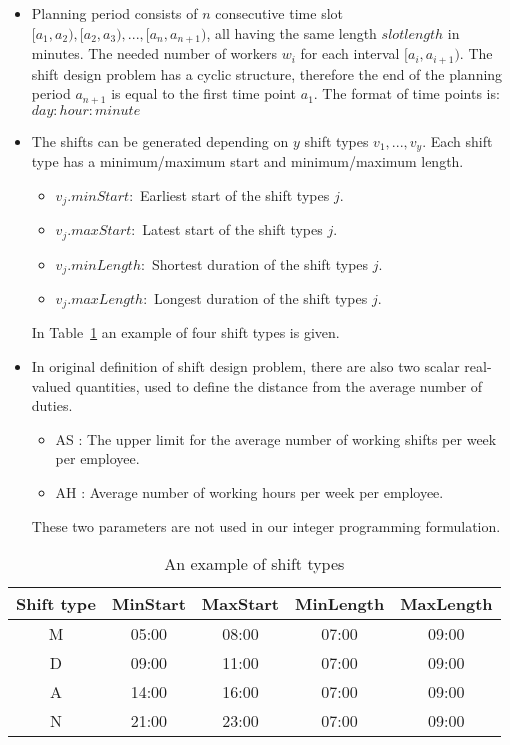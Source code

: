 \begin{itemize}
\item Planning period consists of $n$ consecutive time slot $[a_1,a_2), [a_2,a_3), . . . , [a_n,a_{n+1})$, all having the same length $slotlength$ in minutes. The needed number of workers $w_i$ for each interval $[a_i, a_{i+1})$. The shift design problem has a cyclic structure, therefore the end of the planning period $a_{n+1}$ is equal to the first time point $a_1$. The format of time points is: $day:hour:minute$

\item The shifts can be generated depending on $y$ shift types $v_1,...,v_y$. Each shift type has a minimum/maximum start and  minimum/maximum length. 
\begin{itemize}
\item[] $v_j.minStart :$  Earliest start of the shift types $j$. 
\item[] $v_j.maxStart :$ Latest start of the shift types $j$. 
\item[] $v_j.minLength :$  Shortest duration of the shift types $j$. 
\item[] $v_j.maxLength :$  Longest duration of the shift types $j$. 
\end{itemize}

In Table~\ref{tab:shifttypes} an example of four shift types is given.

\item In original definition of shift design problem, there are also two scalar real-valued quantities, used to define the distance from the average number of duties. 

\begin{itemize}
\item[] AS : The upper limit for the average number of working shifts per week per employee.
\item[] AH : Average number of working hours per week per employee.
\end{itemize}

These two parameters are not used in our integer programming formulation.

\end{itemize}

\begin{table}
  \centering
  \begin{tabular}{ccccc}
    \toprule
    Shift type & MinStart         & MaxStart      & MinLength & MaxLength        \\
    \midrule
    M     & 05:00	 & 08:00          & 07:00 	& 09:00        \\
    D     & 09:00	 & 11:00          & 07:00	& 09:00        \\
    A     & 14:00	 & 16:00          & 07:00	& 09:00        \\
    N     & 21:00	 & 23:00          & 07:00	& 09:00        \\
    \bottomrule
  \end{tabular}
  \caption{An example of shift types}
  \label{tab:shifttypes} 
\end{table}

